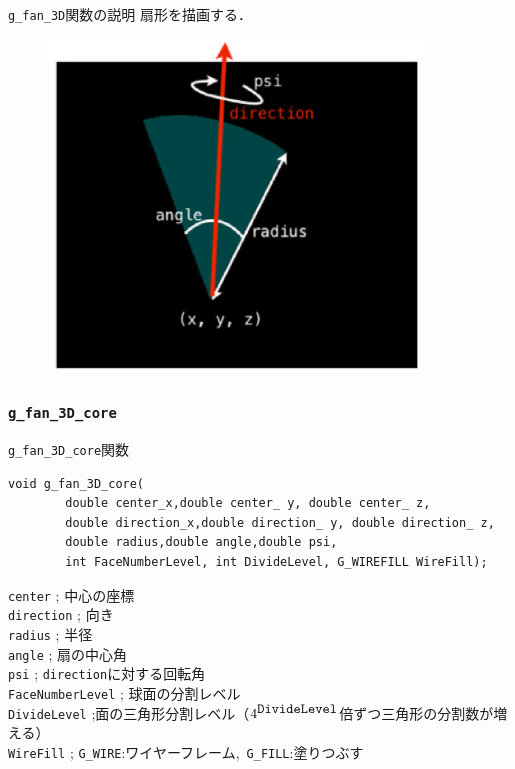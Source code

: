 \documentclass[a4paper,12pt]{jsarticle}%
\begin{document}
\begin{itembox}[l]{\texttt{g\_fan\_3D}関数の説明}
扇形を描画する．
\end{itembox}
\begin{figure}[htb]
	\includegraphics[width=100mm]{./Figures/eps/Canvas_g_fan.eps}
\end{figure}



\clearpage
\subsubsection{\texttt{g\_fan\_3D\_core}}

\begin{itembox}[l]{\texttt{g\_fan\_3D\_core}関数}
\begin{verbatim}
void g_fan_3D_core(
        double center_x,double center_ y, double center_ z,
        double direction_x,double direction_ y, double direction_ z,
        double radius,double angle,double psi,
        int FaceNumberLevel, int DivideLevel, G_WIREFILL WireFill);
\end{verbatim}
\verb|center| ; 中心の座標\\
\verb|direction| ; 向き\\
\verb|radius| ; 半径\\
\verb|angle| ; 扇の中心角\\
\verb|psi| ; \verb|direction|に対する回転角\\
\verb|FaceNumberLevel| ; 球面の分割レベル\\
\verb|DivideLevel| ;面の三角形分割レベル（$4^{\verb|DivideLevel|}$倍ずつ三角形の分割数が増える）\\
\verb|WireFill| ; \verb|G_WIRE|:ワイヤーフレーム,\ \verb|G_FILL|:塗りつぶす \\
\end{itembox}
\end{document}
